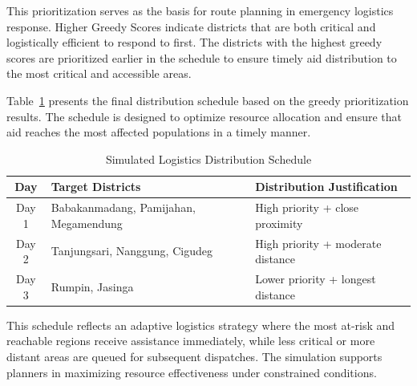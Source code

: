 \documentclass[journal,final,a4paper,twoside,11pt]{IEEEtran}
\begin{document}
This prioritization serves as the basis for route planning in emergency logistics response. Higher Greedy Scores indicate districts that are both critical and logistically efficient to respond to first. The districts with the highest greedy scores are prioritized earlier in the schedule to ensure timely aid distribution to the most critical and accessible areas.

Table~\ref{tab:distribution_schedule} presents the final distribution schedule based on the greedy prioritization results. The schedule is designed to optimize resource allocation and ensure that aid reaches the most affected populations in a timely manner.

\begin{table}[H]
\caption{Simulated Logistics Distribution Schedule}
\begin{center}
\begin{tabular}{|c|p{2cm}|p{3cm}|}
\hline
\textbf{Day} & \textbf{Target Districts} & \textbf{Distribution Justification} \\
\hline
Day 1 & Babakanmadang, Pamijahan, Megamendung & High priority + close proximity \\
Day 2 & Tanjungsari, Nanggung, Cigudeg & High priority + moderate distance \\
Day 3 & Rumpin, Jasinga & Lower priority + longest distance \\
\hline
\end{tabular}
\label{tab:distribution_schedule}
\end{center}
\end{table}

This schedule reflects an adaptive logistics strategy where the most at-risk and reachable regions receive assistance immediately, while less critical or more distant areas are queued for subsequent dispatches. The simulation supports planners in maximizing resource effectiveness under constrained conditions.
\end{document}
